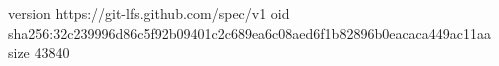 version https://git-lfs.github.com/spec/v1
oid sha256:32c239996d86c5f92b09401c2c689ea6c08aed6f1b82896b0eacaca449ac11aa
size 43840
